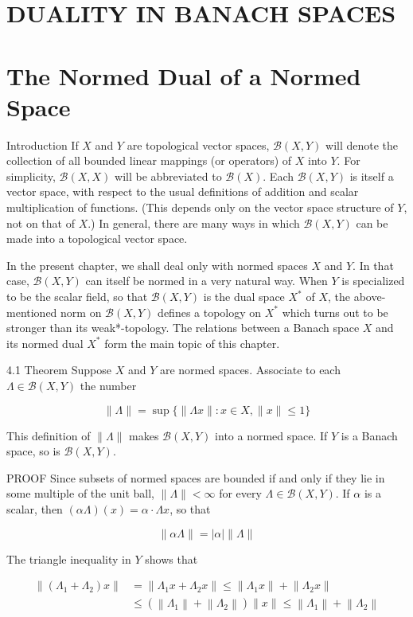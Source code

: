 \documentclass[10pt]{article}
\begin{document}
\section{DUALITY IN BANACH SPACES}
\section{The Normed Dual of a Normed Space}
Introduction If $X$ and $Y$ are topological vector spaces, $\mathscr{B}(X, Y)$ will denote the collection of all bounded linear mappings (or operators) of $X$ into $Y$. For simplicity, $\mathscr{B}(X, X)$ will be abbreviated to $\mathscr{B}(X)$. Each $\mathscr{B}(X, Y)$ is itself a vector space, with respect to the usual definitions of addition and scalar multiplication of functions. (This depends only on the vector space structure of $Y$, not on that of $X$.) In general, there are many ways in which $\mathscr{B}(X, Y)$ can be made into a topological vector space.

In the present chapter, we shall deal only with normed spaces $X$ and $Y$. In that case, $\mathscr{B}(X, Y)$ can itself be normed in a very natural way. When $Y$ is specialized to be the scalar field, so that $\mathscr{B}(X, Y)$ is the dual space $X^{*}$ of $X$, the above-mentioned norm on $\mathscr{B}(X, Y)$ defines a topology on $X^{*}$ which turns out to be stronger than its weak*-topology. The relations between a Banach space $X$ and its normed dual $X^{*}$ form the main topic of this chapter.

4.1 Theorem Suppose $X$ and $Y$ are normed spaces. Associate to each $\Lambda \in \mathscr{B}(X, Y)$ the number

$$
\|\Lambda\|=\sup \{\|\Lambda x\|: x \in X,\|x\| \leq 1\}
$$

This definition of $\|\Lambda\|$ makes $\mathscr{B}(X, Y)$ into a normed space. If $Y$ is a Banach space, so is $\mathscr{B}(X, Y)$.

PROOF Since subsets of normed spaces are bounded if and only if they lie in some multiple of the unit ball, $\|\Lambda\|<\infty$ for every $\Lambda \in \mathscr{B}(X, Y)$. If $\alpha$ is a scalar, then $(\alpha \Lambda)(x)=\alpha \cdot \Lambda x$, so that

$$
\|\alpha \Lambda\|=|\alpha|\|\Lambda\|
$$

The triangle inequality in $Y$ shows that

$$
\begin{aligned}
\left\|\left(\Lambda_{1}+\Lambda_{2}\right) x\right\| & =\left\|\Lambda_{1} x+\Lambda_{2} x\right\| \leq\left\|\Lambda_{1} x\right\|+\left\|\Lambda_{2} x\right\| \\
& \leq\left(\left\|\Lambda_{1}\right\|+\left\|\Lambda_{2}\right\|\right)\|x\| \leq\left\|\Lambda_{1}\right\|+\left\|\Lambda_{2}\right\|
\end{aligned}
$$
\end{document}
